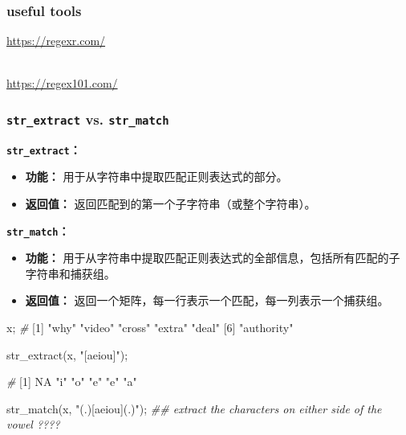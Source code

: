 \documentclass[
]{article}
\newenvironment{Shaded}{}{}
\newcommand{\CommentTok}[1]{\textcolor[rgb]{0.38,0.63,0.69}{\textit{#1}}}
\newcommand{\ConstantTok}[1]{\textcolor[rgb]{0.53,0.00,0.00}{#1}}
\newcommand{\DecValTok}[1]{\textcolor[rgb]{0.25,0.63,0.44}{#1}}
\newcommand{\DocumentationTok}[1]{\textcolor[rgb]{0.73,0.13,0.13}{\textit{#1}}}
\newcommand{\FunctionTok}[1]{\textcolor[rgb]{0.02,0.16,0.49}{#1}}
\newcommand{\NormalTok}[1]{#1}
\newcommand{\StringTok}[1]{\textcolor[rgb]{0.25,0.44,0.63}{#1}}
\begin{document}
\begin{enumerate}
  \hypertarget{useful-tools}{%
  \subsubsection{\texorpdfstring{useful tools
  }{useful tools }}\label{useful-tools}}

  \url{https://regexr.com/}\strut \\
  \url{https://regex101.com/}

  \hypertarget{strextract-vs-strmatch}{%
  \subsubsection{\texorpdfstring{\texttt{str\_extract} vs.
  \texttt{str\_match}}{str\_extract vs. str\_match}}\label{strextract-vs-strmatch}}

  \textbf{\texttt{str\_extract}：}

  \begin{itemize}
  \item
    \textbf{功能：} 用于从字符串中提取匹配正则表达式的部分。
  \item
    \textbf{返回值：} 返回匹配到的第一个子字符串（或整个字符串）。
  \end{itemize}

  \textbf{\texttt{str\_match}：}

  \begin{itemize}
  \item
    \textbf{功能：}
    用于从字符串中提取匹配正则表达式的全部信息，包括所有匹配的子字符串和捕获组。
  \item
    \textbf{返回值：}
    返回一个矩阵，每一行表示一个匹配，每一列表示一个捕获组。
  \end{itemize}

\begin{Shaded}
\begin{Highlighting}[]
\NormalTok{x;}
\CommentTok{\#}
\NormalTok{[}\DecValTok{1}\NormalTok{] }\StringTok{"why"}       \StringTok{"video"}     \StringTok{"cross"}     \StringTok{"extra"}     \StringTok{"deal"}     
\NormalTok{[}\DecValTok{6}\NormalTok{] }\StringTok{"authority"}

\FunctionTok{str\_extract}\NormalTok{(x, }\StringTok{"[aeiou]"}\NormalTok{);}

\CommentTok{\#}
\NormalTok{[}\DecValTok{1}\NormalTok{] }\ConstantTok{NA}  \StringTok{"i"} \StringTok{"o"} \StringTok{"e"} \StringTok{"e"} \StringTok{"a"}

\FunctionTok{str\_match}\NormalTok{(x, }\StringTok{"(.)[aeiou](.)"}\NormalTok{); }\DocumentationTok{\#\# extract the characters on either side of the vowel ????}


\end{Highlighting}
\end{Shaded}
\end{enumerate}
\end{document}
